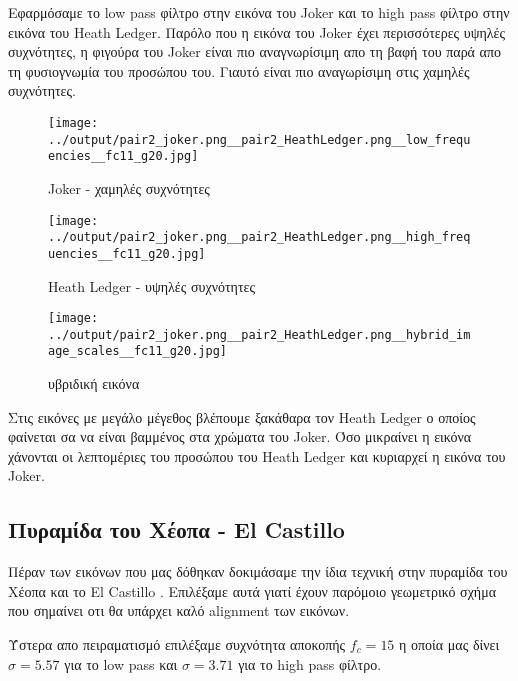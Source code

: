 \documentclass[11pt]{scrartcl} %
\begin{document}
Εφαρμόσαμε το low pass φίλτρο στην εικόνα του Joker και το high pass φίλτρο στην εικόνα του Heath Ledger. Παρόλο που η εικόνα του Joker έχει περισσότερες υψηλές συχνότητες, η φιγούρα του Joker είναι πιο αναγνωρίσιμη απο τη βαφή του παρά απο τη φυσιογνωμία του προσώπου του. Γιαυτό είναι πιο αναγωρίσιμη στις χαμηλές συχνότητες.
\begin{figure}[H]
  \begin{minipage}[c]{9cm}
    \texttt{[image: ../output/pair2\_joker.png\_\_pair2\_HeathLedger.png\_\_low\_frequencies\_\_fc11\_g20.jpg]}
    \caption{Joker - χαμηλές συχνότητες}
  \end{minipage}
  \begin{minipage}[c]{9cm}
    \texttt{[image: ../output/pair2\_joker.png\_\_pair2\_HeathLedger.png\_\_high\_frequencies\_\_fc11\_g20.jpg]}
    \caption{Heath Ledger - υψηλές συχνότητες}
  \end{minipage}
\end{figure}
\begin{figure}[H]
  \texttt{[image: ../output/pair2\_joker.png\_\_pair2\_HeathLedger.png\_\_hybrid\_image\_scales\_\_fc11\_g20.jpg]}
  \caption{υβριδική εικόνα}
\end{figure}
Στις εικόνες με μεγάλο μέγεθος βλέπουμε ξακάθαρα τον Heath Ledger ο οποίος φαίνεται σα να είναι βαμμένος στα χρώματα του Joker. Όσο μικραίνει η εικόνα χάνονται οι λεπτομέριες του προσώπου του Heath Ledger και κυριαρχεί η εικόνα του Joker.

\subsection{Πυραμίδα του Χέοπα - El Castillo}

Πέραν των εικόνων που μας δόθηκαν δοκιμάσαμε την ίδια τεχνική στην πυραμίδα του Χέοπα \cite{wikipedia_kheops} και το El Castillo \cite{britannica_el_castillo}. Επιλέξαμε αυτά γιατί έχουν παρόμοιο γεωμετρικό σχήμα που σημαίνει οτι θα υπάρχει καλό alignment των εικόνων.

Ύστερα απο πειραματισμό επιλέξαμε συχνότητα αποκοπής $f_c = 15$ η οποία μας δίνει $\sigma = 5.57$ για το low pass και $\sigma = 3.71$ για το high pass φίλτρο.
\end{document}
